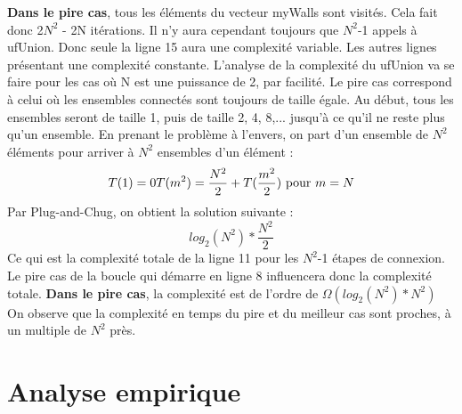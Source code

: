 \documentclass[10pt]{article}
\begin{document}
\begin{description}
\textbf{Dans le pire cas}, tous les éléments du vecteur myWalls sont visités. Cela fait donc 2$N^{2}$ - 2N  itérations. Il n'y aura cependant toujours que $N^{2}$-1 appels à ufUnion. Donc seule la ligne 15 aura une complexité variable. Les autres lignes présentant une complexité constante. L'analyse de la complexité du ufUnion va se faire pour les cas où N est une puissance de 2, par facilité. Le pire cas correspond à celui où les ensembles connectés sont toujours de taille égale. Au début, tous les ensembles seront de taille 1, puis de taille 2, 4, 8,... jusqu'à ce qu'il ne reste plus qu'un ensemble. En prenant le problème à l'envers, on part d'un ensemble de $N^{2}$ éléments pour arriver à $N^{2}$ ensembles d'un élément :
\begin{equation}
	T(1) = 0
	T(m^{2}) = \frac{N^{2}}{2} + T(\frac{m^{2}}{2}) $ pour $ m = N
\end{equation}
Par Plug-and-Chug, on obtient la solution suivante :
\begin{equation}
	log_{2} (N^{2}) * \frac{N^{2}}{2}
\end{equation}
Ce qui est la complexité totale de la ligne 11 pour les $N^{2}$-1 étapes de connexion.
Le pire cas de la boucle qui démarre en ligne 8 influencera donc la complexité totale.
\textbf{Dans le pire cas}, la complexité est de l'ordre de $\Omega(log_{2} (N^{2})*N^{2})$
On observe que la complexité en temps du pire et du meilleur cas sont proches, à un multiple de $N^{2}$ près.
\end{description}
\newpage 
\section{Analyse empirique}
\end{document}
